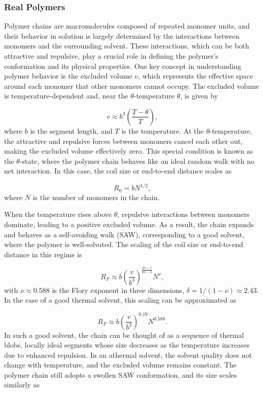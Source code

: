 \documentclass{article}      %
\begin{document}
\subsubsection{Real Polymers}

Polymer chains are macromolecules composed of repeated monomer units, and their behavior in solution is largely determined by the interactions between monomers and the surrounding solvent. These interactions, which can be both attractive and repulsive, play a crucial role in defining the polymer's conformation and its physical properties. One key concept in understanding polymer behavior is the excluded volume \( v \), which represents the effective space around each monomer that other monomers cannot occupy. The excluded volume is temperature-dependent and, near the \(\theta\)-temperature \( \theta \), is given by

\[
v \approx b^3 \left( \frac{T - \theta}{T} \right),
\]
where \( b \) is the segment length, and \( T \) is the temperature. At the \(\theta\)-temperature, the attractive and repulsive forces between monomers cancel each other out, making the excluded volume effectively zero. This special condition is known as the \(\theta\)-state, where the polymer chain behaves like an ideal random walk with no net interaction. In this case, the coil size or end-to-end distance scales as

\[
R_0 = b N^{1/2},
\]
where \( N \) is the number of monomers in the chain.

When the temperature rises above \( \theta \), repulsive interactions between monomers dominate, leading to a positive excluded volume. As a result, the chain expands and behaves as a self-avoiding walk (SAW), corresponding to a good solvent, where the polymer is well-solvated. The scaling of the coil size or end-to-end distance in this regime is

\[
R_F \approx b \left( \frac{v}{b^3} \right)^{\frac{2\nu - 1}{6\nu - 2}} N^\nu,
\]
with \( \nu \approx 0.588 \) is the Flory exponent in three dimensions, \( \delta = 1/(1 - \nu) \approx 2.43 \). In the case of a good thermal solvent, this scaling can be approximated as

\[
R_F \approx b \left( \frac{v}{b^3} \right)^{0.19} N^{0.588}.
\]
In such a good solvent, the chain can be thought of as a sequence of thermal blobs, locally ideal segments whose size decreases as the temperature increases due to enhanced repulsion. In an athermal solvent, the solvent quality does not change with temperature, and the excluded volume remains constant. The polymer chain still adopts a swollen SAW conformation, and its size scales similarly as
\end{document}
